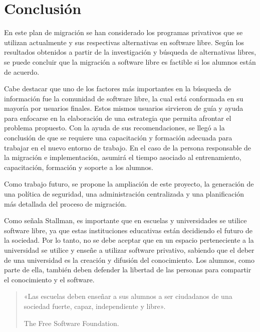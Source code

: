 \chapter{Conclusión}\label{ch:Conclusión}

En este plan de migración se han considerado los programas privativos que se utilizan actualmente y sus respectivas alternativas en software libre. Según los resultados obtenidos a partir de la investigación y búsqueda de alternativas libres, se puede concluir que la migración a software libre es factible si los alumnos están de acuerdo.\par

Cabe destacar que uno de los factores más importantes en la búsqueda de información fue la comunidad de software libre, la cual está conformada en su mayoría por usuarios finales. Estos mismos usuarios sirvieron de guía y ayuda para enfocarse en la elaboración de una estrategia que permita afrontar el problema propuesto. Con la ayuda de sus recomendaciones, se llegó a la conclusión de que se requiere una capacitación y formación adecuada para trabajar en el nuevo entorno de trabajo. En el caso de la persona responsable de la migración e implementación, asumirá el tiempo asociado al entrenamiento, capacitación, formación y soporte a los alumnos.\par

Como trabajo futuro, se propone la ampliación de este proyecto, la generación de una política de seguridad, una administración centralizada y una planificación más detallada del proceso de migración.

Como señala Stallman, es importante que en escuelas y universidades se utilice software libre, ya que estas instituciones educativas están decidiendo el futuro de la sociedad. Por lo tanto, no se debe aceptar que en un espacio perteneciente a la universidad se utilice y enseñe a utilizar software privativo, sabiendo que el deber de una universidad es la creación y difusión del conocimiento. Los alumnos, como parte de ella, también deben defender la libertad de las personas para compartir el conocimiento y el software.	

	
	
	\vspace{0.3cm}
	
	\begin{quote}
		
		\begin{flushright}
			
		{\small	«Las escuelas deben enseñar a sus alumnos a ser ciudadanos de una sociedad fuerte, capaz, independiente y libre».\par
		
		The Free Software Foundation.}
		
	\end{flushright}

		
	\end{quote}

